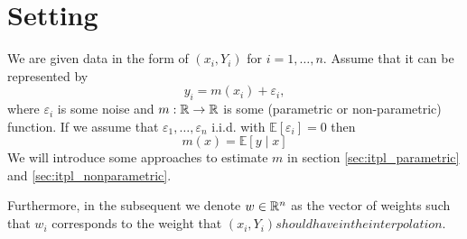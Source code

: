 \section{Setting}{
	We are given data in the form of $\left(x_{i}, Y_{i}\right)$ for $i=1, \ldots, n$. Assume that it can be represented by
	$$
		y_{i}=m\left(x_{i}\right)+\varepsilon_{i},
	$$
	where $\varepsilon_i$ is some noise and $m: \mathbb{R} \rightarrow \mathbb{R}$ is some (parametric or non-parametric) function. If we assume that $\varepsilon_{1}, \ldots, \varepsilon_{n}$ i.i.d. with $\mathbb{E}\left[\varepsilon_{i}\right]=0$ then $$m(x)=\mathbb{E}[y \mid x]$$
	We will introduce some approaches to estimate $m$ in section \ref{sec:itpl_parametric} and \ref{sec:itpl_nonparametric}.

	Furthermore, in the subsequent we denote $w\in \mathbb{R}^n$ as the vector of weights such that $w_i$ corresponds to the weight that $(x_i, Y_i) should have in the interpolation$. 
}








